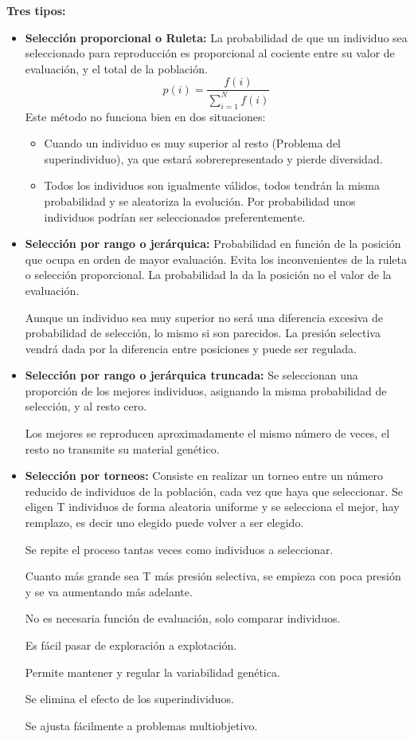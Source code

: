 \documentclass[12pt, twoside, openright]{report} %
\begin{document}
\textbf{Tres tipos:}
\begin{itemize}
	\item \textbf{Selección proporcional o Ruleta:} La probabilidad de que un individuo sea seleccionado para reproducción es proporcional al cociente entre su valor de evaluación, y el total de la población.
	      $$p(i)=\frac{f(i)}{\sum^N_{i=1} f(i)}$$
	      Este método no funciona bien en dos situaciones:
	      \begin{itemize}
		      \item Cuando un individuo es muy superior al resto (Problema del superindividuo), ya que estará sobrerepresentado y pierde diversidad.
		      \item Todos los individuos son igualmente válidos, todos tendrán la misma probabilidad y se aleatoriza la evolución. Por probabilidad unos individuos podrían ser seleccionados preferentemente.
	      \end{itemize}
	\item \textbf{Selección por rango o jerárquica:} Probabilidad en función de la posición que ocupa en orden de mayor evaluación. Evita los inconvenientes de la ruleta o selección proporcional. La probabilidad la da la posición no el valor de la evaluación.

	      Aunque un individuo sea muy superior no será una diferencia excesiva de probabilidad de selección, lo mismo si son parecidos. La presión selectiva vendrá dada por la diferencia entre posiciones y puede ser regulada.
	\item \textbf{Selección por rango o jerárquica truncada:} Se seleccionan una proporción de los mejores individuos, asignando la misma probabilidad de selección, y al resto cero.

	      Los mejores se reproducen aproximadamente el mismo número de veces, el resto no transmite su material genético.
	\item \textbf{Selección por torneos:} Consiste en realizar un torneo entre un número reducido de
	      individuos de la población, cada vez que haya que seleccionar. Se eligen T individuos de forma aleatoria uniforme y se selecciona el mejor, hay remplazo, es decir uno elegido puede volver a ser elegido.

	      Se repite el proceso tantas veces como individuos a seleccionar.

	      Cuanto más grande sea T más presión selectiva, se empieza con poca presión y se va aumentando más adelante.

	      No es necesaria función de evaluación, solo comparar individuos.

	      Es fácil pasar de exploración a explotación.

	      Permite mantener y regular la variabilidad genética.

	      Se elimina el efecto de los superindividuos.

	      Se ajusta fácilmente a problemas multiobjetivo.
\end{itemize}
\pagebreak
\end{document}
